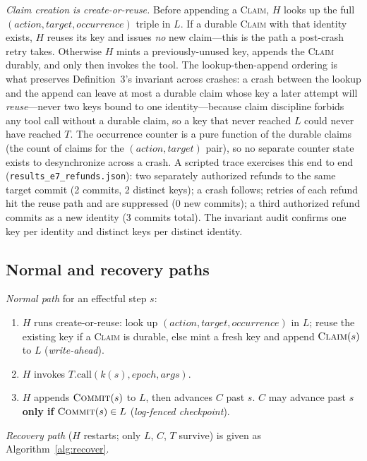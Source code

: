 \documentclass[10pt,journal,compsoc]{IEEEtran}
\begin{document}
\emph{Claim creation is create-or-reuse.} Before appending a
\textsc{Claim}, $H$ looks up the full
$(\mathit{action},\mathit{target},\mathit{occurrence})$ triple
in $L$. If a durable \textsc{Claim} with that identity exists,
$H$ reuses its key and issues \emph{no} new claim---this is the
path a post-crash retry takes. Otherwise $H$ mints a
previously-unused key, appends the \textsc{Claim} durably, and
only then invokes the tool. The lookup-then-append ordering is
what preserves Definition~3's invariant across crashes: a crash
between the lookup and the append can leave at most a durable
claim whose key a later attempt will \emph{reuse}---never two
keys bound to one identity---because claim discipline forbids
any tool call without a durable claim, so a key that never
reached $L$ could never have reached $T$. The occurrence
counter is a pure function of the durable claims (the count of
claims for the $(\mathit{action},\mathit{target})$ pair), so no
separate counter state exists to desynchronize across a crash.
A scripted trace exercises this end to end
(\texttt{results\_e7\_refunds.json}): two separately
authorized refunds to the same target commit (2 commits, 2
distinct keys); a crash follows; retries of each refund hit
the reuse path and are suppressed (0 new commits); a third
authorized refund commits as a new identity (3 commits total).
The invariant audit confirms one key per identity and distinct
keys per distinct identity.

\subsection{Normal and recovery paths}

\emph{Normal path} for an effectful step $s$:
\begin{enumerate}[nosep]
\item $H$ runs create-or-reuse: look up
$(\mathit{action},\mathit{target},\mathit{occurrence})$ in $L$;
reuse the existing key if a \textsc{Claim} is durable, else
mint a fresh key and append $\textsc{Claim}(s)$ to $L$
(\emph{write-ahead}).
\item $H$ invokes $T.\mathrm{call}(k(s), \mathit{epoch},
\mathit{args})$.
\item $H$ appends $\textsc{Commit}(s)$ to $L$, then advances $C$
past $s$. $C$ may advance past $s$ \textbf{only if}
$\textsc{Commit}(s) \in L$ (\emph{log-fenced checkpoint}).
\end{enumerate}

\emph{Recovery path} ($H$ restarts; only $L$, $C$, $T$ survive)
is given as Algorithm~\ref{alg:recover}.
\end{document}
